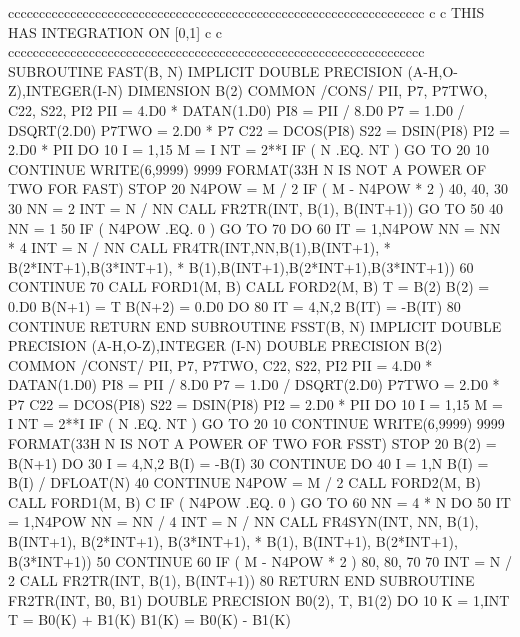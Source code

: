 ccccccccccccccccccccccccccccccccccccccccccccccccccccccccccccccccccc
c
c   THIS HAS INTEGRATION ON [0,1]
c
c
ccccccccccccccccccccccccccccccccccccccccccccccccccccccccccccccccccc      
      SUBROUTINE FAST(B, N)
      IMPLICIT DOUBLE PRECISION (A-H,O-Z),INTEGER(I-N)
      DIMENSION B(2)
      COMMON /CONS/ PII, P7, P7TWO, C22, S22, PI2
      PII = 4.D0 * DATAN(1.D0)
      PI8 = PII / 8.D0
      P7 = 1.D0 / DSQRT(2.D0)
      P7TWO = 2.D0 * P7
      C22 = DCOS(PI8)
      S22 = DSIN(PI8)
      PI2 = 2.D0 * PII
      DO 10 I = 1,15
          M = I
          NT = 2**I
          IF ( N .EQ. NT ) GO TO 20
10    CONTINUE
      WRITE(6,9999)
9999  FORMAT(33H N IS NOT A POWER OF TWO FOR FAST)
      STOP
20    N4POW = M / 2
      IF ( M - N4POW * 2 ) 40, 40, 30
30    NN = 2
      INT = N / NN
      CALL FR2TR(INT, B(1), B(INT+1))
      GO TO 50
40    NN = 1
50    IF ( N4POW .EQ. 0 ) GO TO 70
      DO 60 IT = 1,N4POW
          NN = NN * 4
          INT = N / NN
          CALL FR4TR(INT,NN,B(1),B(INT+1),
     *         B(2*INT+1),B(3*INT+1),
     *         B(1),B(INT+1),B(2*INT+1),B(3*INT+1))
60    CONTINUE
70    CALL FORD1(M, B)
      CALL FORD2(M, B)
      T = B(2)
      B(2) = 0.D0
      B(N+1) = T
      B(N+2) = 0.D0
      DO 80 IT = 4,N,2
          B(IT) = -B(IT)
80    CONTINUE
      RETURN
      END
      SUBROUTINE FSST(B, N)
      IMPLICIT DOUBLE PRECISION (A-H,O-Z),INTEGER (I-N)
      DOUBLE PRECISION B(2)
      COMMON /CONST/ PII, P7, P7TWO, C22, S22, PI2
      PII = 4.D0 *  DATAN(1.D0)
      PI8 = PII / 8.D0
      P7 = 1.D0 / DSQRT(2.D0)
      P7TWO = 2.D0 * P7
      C22 = DCOS(PI8)
      S22 = DSIN(PI8)
      PI2 = 2.D0 * PII
      DO 10 I = 1,15
          M = I
          NT = 2**I
          IF ( N .EQ. NT ) GO TO 20
10    CONTINUE
      WRITE(6,9999)
9999  FORMAT(33H N IS NOT A POWER OF TWO FOR FSST)
      STOP
20    B(2) = B(N+1)
      DO 30 I =  4,N,2
          B(I) = -B(I)
30    CONTINUE
      DO 40 I = 1,N
          B(I) = B(I) / DFLOAT(N)
40    CONTINUE
      N4POW = M / 2
      CALL FORD2(M, B)
      CALL FORD1(M, B)
C
      IF ( N4POW .EQ. 0 ) GO TO 60
      NN = 4 * N
      DO 50 IT = 1,N4POW
          NN = NN / 4
          INT = N / NN
          CALL FR4SYN(INT, NN, B(1), B(INT+1), B(2*INT+1), B(3*INT+1),
     *                B(1), B(INT+1), B(2*INT+1), B(3*INT+1))
50    CONTINUE
60    IF ( M - N4POW * 2 ) 80, 80, 70
70    INT = N / 2
      CALL FR2TR(INT, B(1), B(INT+1))
80    RETURN
      END
      SUBROUTINE FR2TR(INT, B0, B1)
      DOUBLE PRECISION B0(2), T, B1(2)
      DO 10 K = 1,INT
          T = B0(K) + B1(K)
          B1(K) = B0(K) - B1(K)
